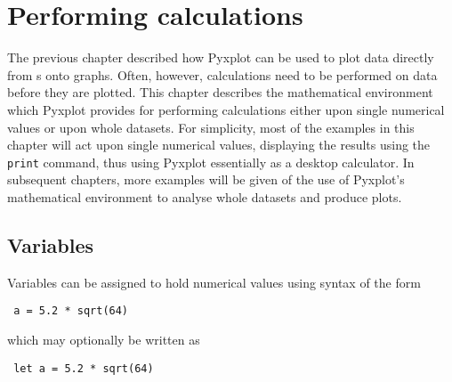 %
%
%
%
%



\chapter{Performing calculations}

The previous chapter described how Pyxplot can be used to plot data directly
from \datafile s onto graphs. Often, however, calculations need to be performed
on data before they are plotted. This chapter describes the mathematical
environment which Pyxplot provides for performing calculations either upon
single numerical values or upon whole datasets.  For simplicity, most of the
examples in this chapter will act upon single numerical values, displaying the
results using the {\tt print} command, thus using Pyxplot essentially as a
desktop calculator. In subsequent chapters, more examples will be given of the
use of Pyxplot's mathematical environment to analyse whole datasets and produce
plots.

\section{Variables}

Variables can be assigned to hold numerical values using syntax of the form

\begin{verbatim} a = 5.2 * sqrt(64) \end{verbatim}

\noindent which may optionally be written as

\begin{verbatim} let a = 5.2 * sqrt(64) \end{verbatim}

